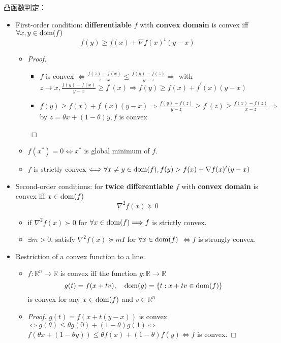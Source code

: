 \begin{remark}
    凸函数判定：
    \begin{itemize}
        \item First-order condition: \textbf{differentiable} $f$ with \textbf{convex domain} is convex iff $\forall x, y \in \operatorname{dom}(f)$\[f(y) \geq f(x)+\nabla f(x)^{t}(y-x)\]
        \begin{itemize}
            \item \begin{proof}\text{}\begin{itemize}
                \item $f$ is convex $\Longleftrightarrow \frac{f(z)-f(x)}{z-x} \leq \frac{f(y)-f(z)}{y-z} \Longrightarrow $ with $z \to x,\frac{f(y)-f(x)}{y-x} \ge f^\prime(x) \Longrightarrow f(y) \ge f(x) + f^\prime(x)(y - x)$
                \item $f(y) \ge f(x) + f^\prime(x)(y - x) \Longrightarrow \frac{f(y) - f(z)}{y - z} \ge f^\prime(z) \ge \frac{f(x) - f(z)}{x - z} \Longrightarrow $ by $z = \theta x + (1 - \theta)y,f$ is convex
            \end{itemize}\end{proof}
            \item $f(x^*) = 0 \Longleftrightarrow x^*$ is global minimum of $f$. 
            \item $f$ is strictly convex $\Longleftrightarrow \forall x \neq y\in \operatorname{dom}(f), f(y) > f(x) + \nabla f(x)^t(y - x)$
        \end{itemize}
        \item Second-order conditions: for \textbf{twice differentiable} $f$ with \textbf{convex domain} is convex iff $x \in \operatorname{dom}(f)$ \[\nabla^2f(x) \succeq 0\]
        \begin{itemize}
            \item if $\nabla^2 f(x) \succ 0$ for $\forall x \in \operatorname{dom}(f) \Longrightarrow f$ is strictly convex.
            \item $\exists m > 0$, satisfy $\nabla^2f(x) \succeq mI$ for $\forall x \in \operatorname{dom}(f)$ $\Longleftrightarrow f$ is strongly convex.
        \end{itemize}
        \item Restriction of a convex function to a line:
        \begin{itemize}
            \item $f: \mathbb{R}^n \to \mathbb{R}$ is convex iff the function $g: \mathbb{R} \to \mathbb{R}$\[g(t) = f(x + tv), \quad \operatorname{dom}(g) = \left\{t: x + tv \in \operatorname{dom}(f)\right\}\] is convex for any $x \in \operatorname{dom}(f)$ and $v \in \mathbb{R}^n$
            \item \begin{proof}$g(t) = f(x + t(y - x))$ is convex $\Longleftrightarrow g(\theta) \le \theta g(0) + (1 - \theta)g(1) \Longleftrightarrow$ $f(\theta x + (1 - \theta y)) \le \theta f(x) + (1 - \theta)f(y) \Longleftrightarrow f$ is convex.\end{proof}
        \end{itemize}
    \end{itemize}
\end{remark}

